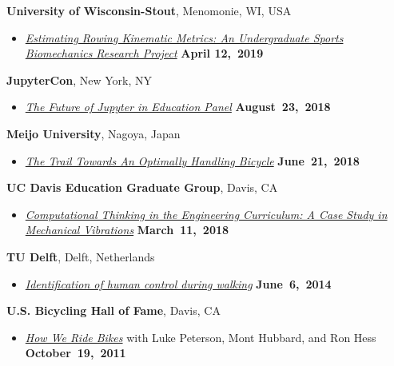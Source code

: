 \documentclass[10pt]{article}
\newenvironment{outerlist}[1][\enskip\textbullet]%
        {\begin{itemize}[#1]}{\end{itemize}%
         \vspace{-.6\baselineskip}}
\newcommand{\blankline}{\quad\pagebreak[2]}
\begin{document}
\textbf{University of Wisconsin-Stout}, Menomonie, WI, USA
\begin{outerlist}
\item[]
  \href{}{\href{https://youtu.be/I_TR6XIf6FQ}{\textit{Estimating Rowing Kinematic Metrics: An Undergraduate Sports
  Biomechanics Research Project}}}
    \hfill \textbf{April 12,~2019}
\end{outerlist}

\blankline

\textbf{JupyterCon}, New York, NY
\begin{outerlist}
\item[]
  \href{}{\textit{The Future of Jupyter in Education Panel}}
    \hfill \textbf{August~23,~2018}
\end{outerlist}

\blankline

\textbf{Meijo University}, Nagoya, Japan
\begin{outerlist}
\item[]
  \href{}{\textit{The Trail Towards An Optimally Handling Bicycle}}
    \hfill \textbf{June~21,~2018}
\end{outerlist}

\blankline

\textbf{UC Davis Education Graduate Group}, Davis, CA
\begin{outerlist}
\item[]
  \href{}{\textit{Computational Thinking in the Engineering Curriculum: A Case
  Study in Mechanical Vibrations}}
    \hfill \textbf{March~11,~2018}
\end{outerlist}

\blankline

\textbf{TU Delft}, Delft, Netherlands
\begin{outerlist}
\item[]
  \href{http://www.moorepants.info/presentations/2014/tu-delft-robotics-talk-2014}{\textit{Identification
  of human control during walking}}
    \hfill \textbf{June~6,~2014}
\end{outerlist}

\blankline

\textbf{U.S. Bicycling Hall of Fame}, Davis, CA
\begin{outerlist}
\item[] \textit{\href{http://mae.ucdavis.edu/~biosport/bhoftalk/}{How We Ride
  Bikes}} with Luke Peterson, Mont Hubbard, and Ron Hess
    \hfill \textbf{October~19,~2011}
\end{outerlist}
\end{document}
